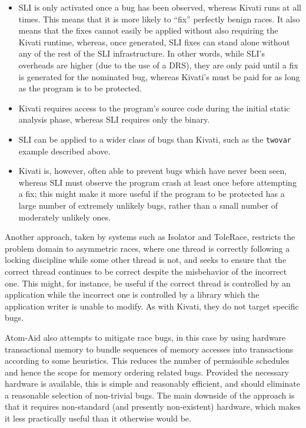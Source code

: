 \documentclass[10pt,letter,twocolumn]{sigplanconf}
\newcommand{\editorial}[1]{}
\begin{document}
\begin{itemize}
\item SLI is only activated once a bug has been observed, whereas
  Kivati runs at all times.  This means that it is more likely to
  ``fix'' perfectly benign races.  It also means that the fixes cannot
  easily be applied without also requiring the Kivati runtime,
  whereas, once generated, SLI fixes can stand alone without any of
  the rest of the SLI infrastructure.  In other words, while SLI's
  overheads are higher (due to the use of a DRS), they are only paid
  until a fix is generated for the nominated bug, whereas Kivati's
  must be paid for as long as the program is to be protected.
\item Kivati requires access to the program's source code during the
  initial static analysis phase, whereas SLI requires only the binary.
\item SLI can be applied to a wider class of bugs than Kivati, such as
  the \verb|twovar| example described above.
\item Kivati is, however, often able to prevent bugs which have never
  been seen, whereas SLI must observe the program crash at least once
  before attempting a fix; this might make it more useful if the
  program to be protected has a large number of extremely unlikely
  bugs, rather than a small number of moderately unlikely ones.
\end{itemize}

Another approach, taken by systems such as Isolator
\cite{Ramalingam2009} and ToleRace\cite{Ratanaworabhan2008}, restricts
the problem domain to asymmetric races, where one thread is correctly
following a locking discipline while some other thread is not, and
seeks to ensure that the correct thread continues to be correct
despite the misbehavior of the incorrect one.  This might, for
instance, be useful if the correct thread is controlled by an
application while the incorrect one is controlled by a library which
the application writer is unable to modify.  As with Kivati, they do
not target specific bugs.\editorial{...}

Atom-Aid\cite{Lucia2009} also attempts to mitigate race bugs, in
this case by using hardware transactional memory to
bundle sequences of memory accesses into
transactions according to some heuristics.  This reduces the
number of permissible schedules and hence the scope for memory
ordering related bugs.  Provided the necessary hardware is available,
this is simple and reasonably efficient, and should eliminate a
reasonable selection of non-trivial bugs.  The main downside of the
approach is that it requires non-standard (and presently non-existent)
hardware, which makes it less practically useful than it otherwise
would be.
\end{document}
